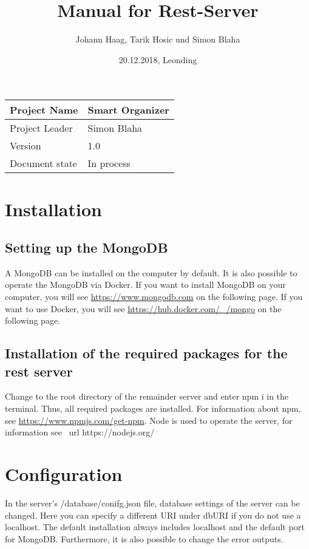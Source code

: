 \documentclass[12pt]{scrartcl}
\title{Manual for Rest-Server}
\author{Johann Haag, Tarik Hosic und Simon Blaha}
\date{20.12.2018, Leonding}
\begin{document}
    \maketitle
    \begin{flushleft}
    \begin{tabular}{|l|l|}
    \hline
    Project Name & Smart Organizer \\ \hline
    Project Leader & Simon Blaha \\ \hline
    Version & 1.0\\ \hline
    Document state & In process \\ \hline
    \end{tabular}
    \end{flushleft}

    \pagebreak
    \tableofcontents
    \pagebreak

    \section{Installation}
    \subsection{Setting up the MongoDB}
        A MongoDB can be installed on the computer by default. It is also possible to operate the MongoDB via Docker.
        If you want to install MongoDB on your computer, you will see \url{https://www.mongodb.com} on the following page.
        If you want to use Docker, you will see \url{https://hub.docker.com/_/mongo} on the following page.
    \subsection{Installation of the required packages for the rest server}
        Change to the root directory of the remainder server and enter npm i in the terminal.
        Thus, all required packages are installed.
        For information about npm, see \url{https://www.npmjs.com/get-npm}.
        Node is used to operate the server, for information see \ url {https://nodejs.org/}

    \section{Configuration}      
        In the server's /database/conifg.json file, database settings of the server can be changed.
        Here you can specify a different URI under dbURI if you do not use a localhost.
        The default installation always includes localhost and the default port for MongoDB.
        Furthermore, it is also possible to change the error outputs.
\end{document}
